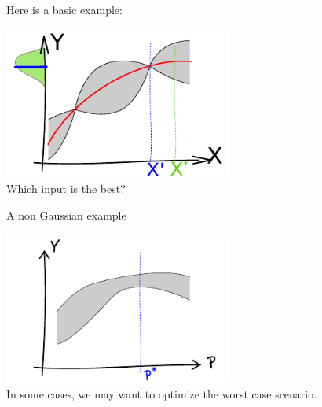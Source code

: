 \documentclass{beamer}
\begin{document}
\begin{frame}{}

\begin{example}
Here is a basic example:
\begin{center}
\includegraphics[height=5cm]{figures/optim_rob_b}\\
Which input is the best?
\end{center}
\end{example}
\end{frame}

\begin{frame}[noframenumbering]{}
\begin{example}
A non Gaussian example
\begin{center}
\includegraphics[height=5cm]{figures/optim_rob_c}\\
In some cases, we may want to optimize the worst case scenario. 
\end{center}
\end{example}
\end{frame}
\end{document}
